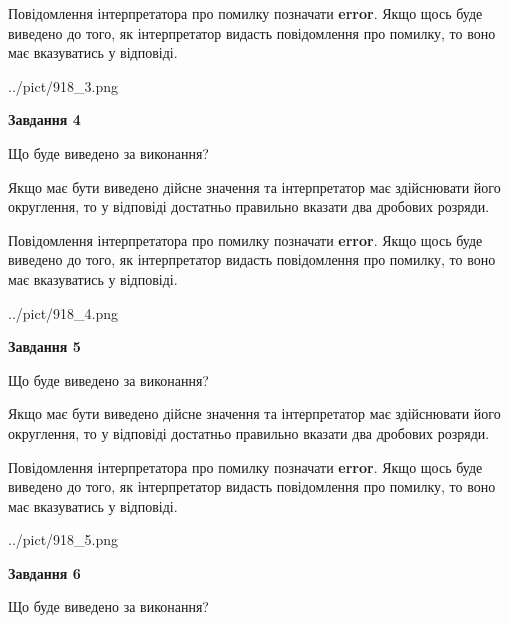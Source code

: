 \documentclass[12pt, ukrainian]{article}
\begin{document}
{\begin {Large}
Повідомлення інтерпретатора про помилку позначати \textbf{error}.
Якщо щось буде виведено до того, як інтерпретатор видасть повідомлення про помилку, 
то воно має вказуватись у відповіді. \par

\begin{center}
	{../pict/918_3.png}
\end{center}
\newpage

{\begin {center}\textbf{Завдання 4}\end {center}}\par
Що буде виведено за виконання? \par

Якщо має бути виведено дійсне значення та інтерпретатор має здійснювати його округлення, 
то у відповіді достатньо правильно вказати два дробових розряди.

Повідомлення інтерпретатора про помилку позначати \textbf{error}.
Якщо щось буде виведено до того, як інтерпретатор видасть повідомлення про помилку, 
то воно має вказуватись у відповіді. \par

\begin{center}
	{../pict/918_4.png}
\end{center}
\newpage

{\begin {center}\textbf{Завдання 5}\end {center}}\par
Що буде виведено за виконання? \par

Якщо має бути виведено дійсне значення та інтерпретатор має здійснювати його округлення, 
то у відповіді достатньо правильно вказати два дробових розряди.

Повідомлення інтерпретатора про помилку позначати \textbf{error}.
Якщо щось буде виведено до того, як інтерпретатор видасть повідомлення про помилку, 
то воно має вказуватись у відповіді. \par

\begin{center}
	{../pict/918_5.png}
\end{center}
\newpage

{\begin {center}\textbf{Завдання 6}\end {center}}\par
Що буде виведено за виконання? \par


\end{Large}}
\end{document}
